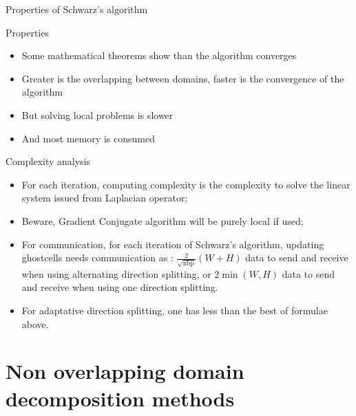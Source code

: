 \documentclass[compress,10pt,aspectratio=169]{beamer}
\begin{document}
\begin{frame}[fragile]{Properties of Schwarz's algorithm}
\scriptsize
\begin{block}{\small Properties}
  \begin{itemize}
    \item Some mathematical theorems show than the algorithm converges
    \item Greater is the overlapping between domains, faster is the convergence of the algorithm
    \item But solving local problems is slower
    \item And most memory is consumed
  \end{itemize}
\end{block}  

\begin{exampleblock}{\small Complexity analysis}
  \begin{itemize}
    \item For each iteration, computing complexity is the complexity to solve the linear system issued from Laplacian operator;
    \item Beware, Gradient Conjugate algorithm will be purely local if used;
    \item For communication, for each iteration of Schwarz's algorithm, updating ghostcells needs communication as :
    $\displaystyle \frac{2}{\sqrt{\mbox{nbp}}}\left(W + H\right)$ data to send and receive when using alternating
    direction splitting, or $2\min\left(W,H\right)$ data to send and receive when using one direction splitting.
  \item For adaptative direction splitting, one has less than the best of formulae above.
  \end{itemize}
\end{exampleblock}
\end{frame}

\section{Non overlapping domain decomposition methods}
\end{document}
